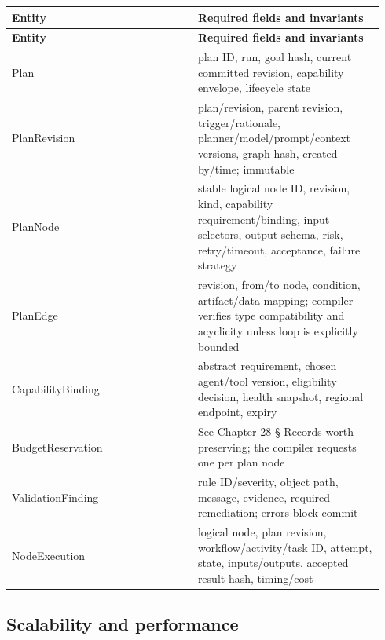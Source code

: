 \BookTableStart
\small
\begin{longtable}{@{}Y{0.4700\linewidth}Y{0.4700\linewidth}@{}}
\color{white}\bfseries \textbf{Entity} & \color{white}\bfseries \textbf{Required fields and invariants} \\
\endfirsthead
{}
\color{white}\bfseries \textbf{Entity} & \color{white}\bfseries \textbf{Required fields and invariants} \\
\endhead
Plan & plan ID, run, goal hash, current committed revision, capability envelope, lifecycle state \\
PlanRevision & plan/revision, parent revision, trigger/rationale, planner/model/prompt/context versions, graph hash, created by/time; immutable \\
PlanNode & stable logical node ID, revision, kind, capability requirement/binding, input selectors, output schema, risk, retry/timeout, acceptance, failure strategy \\
PlanEdge & revision, from/to node, condition, artifact/data mapping; compiler verifies type compatibility and acyclicity unless loop is explicitly bounded \\
CapabilityBinding & abstract requirement, chosen agent/tool version, eligibility decision, health snapshot, regional endpoint, expiry \\
BudgetReservation & See Chapter 28 § Records worth preserving; the compiler requests one per plan node \\
ValidationFinding & rule ID/severity, object path, message, evidence, required remediation; errors block commit \\
NodeExecution & logical node, plan revision, workflow/activity/task ID, attempt, state, inputs/outputs, accepted result hash, timing/cost \\
\end{longtable}
\BookTableEnd

\subsection{Scalability and performance}

